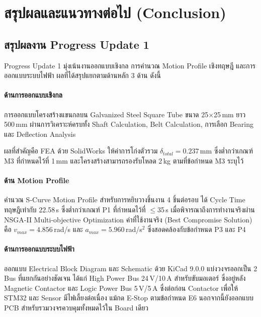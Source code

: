 \section{สรุปผลและแนวทางต่อไป (Conclusion)}
\label{sec:conclusion}

\subsection{สรุปผลงาน Progress Update 1}
\label{subsec:progress_update_1}

Progress Update 1 มุ่งเน้นงานออกแบบเชิงกล
การคำนวณ Motion Profile เชิงทฤษฎี
และการออกแบบระบบไฟฟ้า
ผลที่ได้สรุปแยกตามด้านหลัก 3 ด้าน ดังนี้

\paragraph{ด้านการออกแบบเชิงกล}

การออกแบบโครงสร้างแขนกลบน Galvanized Steel
Square Tube ขนาด 25$\times$25\,mm ยาว 500\,mm
ผ่านการวิเคราะห์ครบทั้ง Shaft Calculation,
Belt Calculation, การเลือก Bearing
และ Deflection Analysis

ผลที่สำคัญคือ FEA ด้วย SolidWorks
ให้ค่าการโก่งตัวรวม $\delta_{total} = 0.237$\,mm
ซึ่งต่ำกว่าเกณฑ์ M3 ที่กำหนดไว้ที่ 1\,mm
และโครงสร้างสามารถรองรับโหลด 2\,kg
ตามที่ข้อกำหนด M3 ระบุไว้

\paragraph{ด้าน Motion Profile}

คำนวณ S-Curve Motion Profile
สำหรับการหยิบวางชิ้นงาน 4 ชิ้นต่อรอบ
ได้ Cycle Time ทฤษฎีเท่ากับ 22.58\,s
ซึ่งต่ำกว่าเกณฑ์ P1 ที่กำหนดไว้ที่ $\leq$35\,s
เมื่อพิจารณาถึงการทำงานจริงผ่าน NSGA-II
Multi-objective Optimization
ค่าที่ใช้งานจริง (Best Compromise Solution)
คือ $v_{max} = 4.856$\,rad/s
และ $a_{max} = 5.960$\,rad/s$^2$
ซึ่งสอดคล้องกับข้อกำหนด P3 และ P4

\paragraph{ด้านการออกแบบระบบไฟฟ้า}

ออกแบบ Electrical Block Diagram และ Schematic
ด้วย KiCad 9.0.0 แบ่งวงจรออกเป็น 2 Bus
ที่แยกกันอย่างชัดเจน ได้แก่
High Power Bus 24\,V/10\,A สำหรับขับมอเตอร์
ซึ่งอยู่หลัง Magnetic Contactor
และ Logic Power Bus 5\,V/5\,A
ซึ่งต่อก่อน Contactor
เพื่อให้ STM32 และ Sensor มีไฟเลี้ยงต่อเนื่อง
แม้กด E-Stop ตามข้อกำหนด E6
นอกจากนี้ยังออกแบบ PCB
สำหรับรวมวงจรควบคุมทั้งหมดไว้ใน Board เดียว

